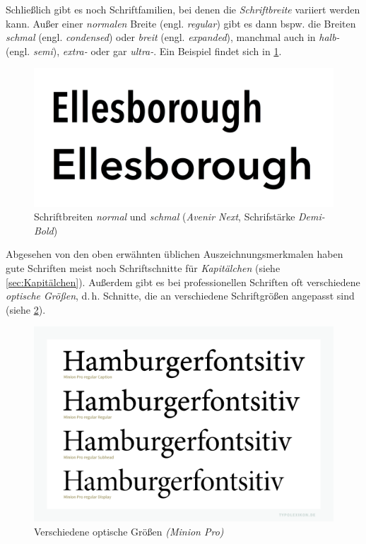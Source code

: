 Schließlich gibt es noch Schriftfamilien, bei denen die
\emph{Schriftbreite} variiert werden kann.  Außer einer
\emph{normalen} Breite
(engl. \emph{\foreignlanguage{british}{regular}}) gibt es dann
bspw. die Breiten \emph{schmal}
(engl. \emph{\foreignlanguage{british}{condensed}}) oder \emph{breit}
(engl. \emph{\foreignlanguage{british}{expanded}}), manchmal auch in
\emph{halb-} (engl. \emph{\foreignlanguage{british}{semi}}),
\emph{extra-} oder gar \emph{ultra-}.  Ein Beispiel findet sich in
\cref{fig:Schriftbreiten}.

\begin{figure}
  \centering
  \includegraphics[width=.5\textwidth]{Schriftbreiten}
  \caption{Schriftbreiten \emph{normal} und \emph{schmal}
    (\emph{Avenir Next}, Schrifstärke \emph{Demi-Bold})}
  \label{fig:Schriftbreiten}
\end{figure}

Abgesehen von den oben erwähnten üblichen Auszeichnungsmerkmalen haben
gute Schriften meist noch Schriftschnitte für \emph{Kapitälchen}
(siehe \cref{sec:Kapitälchen}).  Außerdem gibt es bei professionellen
Schriften oft verschiedene \emph{optische Größen}, d.\,h. Schnitte,
die an verschiedene Schriftgrößen angepasst sind (siehe
\cref{fig:optische_Größen}).

\begin{figure}
  \centering
  \includegraphics[width=.65\textwidth]{optische_Größen}
  \caption{Verschiedene optische Größen \emph{(Minion
      Pro)}\protect\footnotemark}
  \label{fig:optische_Größen}
\end{figure}

